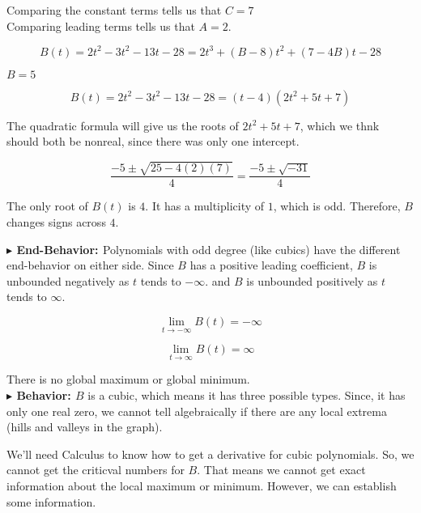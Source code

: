 \documentclass{ximera}
\begin{document}
\begin{exercise}
Comparing the constant terms tells us that $C = 7$ \\



Comparing leading terms tells us that $A = 2$.



\[
B(t) = 2 t^2 - 3 t^2 - 13 t - 28 = 2 t^3 + (B - 8) t^2 + (7 - 4 B) t - 28 
\]


$B = 5$



\[
B(t) = 2 t^2 - 3 t^2 - 13 t - 28 = (t-4)(2 t^2 + 5 t + 7)
\]




The quadratic formula will give us the roots of $2 t^2 + 5 t + 7$, which we thnk should both be nonreal, since there was only one intercept.


\[
\frac{-5 \pm \sqrt{25-4 (2) (7)}}{4} = \frac{-5 \pm \sqrt{-31}}{4}
\]







The only root of $B(t)$ is $4$.  It has a multiplicity of $1$, which is odd.  Therefore, $B$ changes signs across $4$.










\textbf{\textcolor{blue!55!black}{$\blacktriangleright$ End-Behavior: }} Polynomials with odd degree (like cubics) have the different end-behavior on either side.  Since $B$ has a positive leading coefficient, $B$ is unbounded negatively as $t$ tends to $-\infty$. and $B$ is unbounded positively as $t$ tends to $\infty$.

\[
\lim\limits_{t \to -\infty} B(t) = -\infty
\]


\[
\lim\limits_{t \to \infty} B(t) = \infty
\]


There is no global maximum or global minimum. \\



\textbf{\textcolor{blue!55!black}{$\blacktriangleright$ Behavior: }}  $B$ is a cubic, which means it has three possible types. Since, it has only one real zero, we cannot tell algebraically if there are any local extrema (hills and valleys in the graph).




We'll need Calculus to know how to get a derivative for cubic polynomials.  So, we cannot get the criticval numbers for $B$.  That means we cannot get exact information about the local maximum or minimum.  However, we can establish some information.








\end{exercise}
\end{document}
